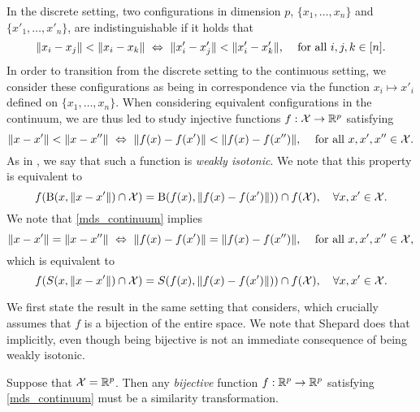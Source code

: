 \documentclass[twoside, 11pt]{article}
\begin{document}
In the discrete setting, two configurations in dimension $p$, $\{x_1, \dots, x_n\}$ and $\{x'_1, \dots, x'_n\}$, are indistinguishable if it holds that
\begin{equation}
\text{$\|x_i-x_j\| < \|x_i-x_k\| \iff \|x'_i-x'_j\| < \|x'_i-x'_k\|$, \quad for all $i,j,k \in [n]$.}
\end{equation}
In order to transition from the discrete setting to the continuous setting, we consider these configurations as being in correspondence via the function $x_i \mapsto x'_i$ defined on $\{x_1, \dots, x_n\}$. 
When considering equivalent configurations in the continuum, we are thus led to study injective functions $f : \cX \to \bbR^p$ satisfying 
\begin{equation}
\label{mds_continuum}
\text{$\|x-x'\| < \|x-x''\| \iff \|f(x)-f(x')\| < \|f(x)-f(x'')\|$, \quad for all $x, x', x'' \in \cX$.}
\end{equation}
As in \cite{klein}, we say that such a function is {\em weakly isotonic}.
We note that this property is equivalent to 
\begin{equation}
\label{mds_continuum_set}
f(\ball(x, \|x-x'\|) \cap \cX) = \ball(f(x), \|f(x)-f(x')\|)) \cap f(\cX), \quad \forall x,x' \in \cX. 
\end{equation}
We note that \eqref{mds_continuum} implies
\begin{equation}
\label{mds_continuum_equal}
\text{$\|x-x'\| = \|x-x''\| \iff \|f(x)-f(x')\| = \|f(x)-f(x'')\|$, \quad for all $x, x', x'' \in \cX$,}
\end{equation}
which is equivalent to
\begin{equation}\label{mds_continuum_equal_set}
f(\sphere(x, \|x-x'\|) \cap \cX) = \sphere(f(x), \|f(x)-f(x')\|)) \cap f(\cX), \quad \forall x,x' \in \cX.
\end{equation}

We first state the result in the same setting that \citet{shepard1966metric} considers, which crucially assumes that $f$ is a bijection of the entire space. We note that Shepard does that implicitly, even though being bijective is not an immediate consequence of being weakly isotonic.

\begin{proposition}
\label{prp:shepard}
Suppose that $\cX = \bbR^p$. Then any {\em bijective} function $f: \bbR^p \to \bbR^p$ satisfying \eqref{mds_continuum} must be a similarity transformation. 
\end{proposition}
\end{document}
